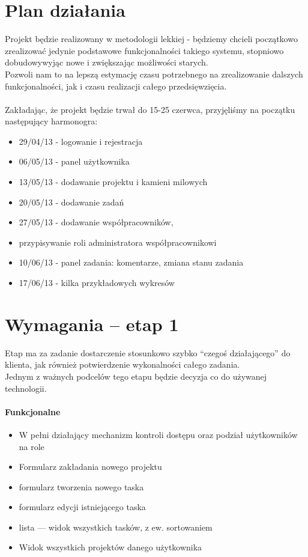\documentclass[a4paper,12pt,notitlepage]{mwrep}
\begin{document}
\section{Plan działania}
Projekt będzie realizowany w metodologii lekkiej - będziemy chcieli początkowo
zrealizować jedynie podstawowe funkcjonalności takiego systemu, stopniowo dobudowywyjąc
nowe i zwiększając możliwości starych.\\
Pozwoli nam to na lepszą estymację czasu potrzebnego na zrealizowanie dalszych funkcjonalności,
jak i czasu realizacji całego przedsięwzięcia.
\\
\\
Zakładając, że projekt będzie trwał do 15-25 czerwca, przyjęliśmy na początku następujący harmonogra:
\begin{itemize}
	\item	29/04/13 - logowanie i rejestracja
	\item	06/05/13 - panel użytkownika
	\item	13/05/13 - dodawanie projektu i kamieni milowych
	\item	20/05/13 - dodawanie zadań
	\item	27/05/13 - dodawanie współpracowników,
	\item	przypisywanie roli administratora współpracownikowi
	\item	10/06/13 - panel zadania: komentarze, zmiana stanu
		zadania
	\item	17/06/13 - kilka przykładowych wykresów

\end{itemize}




\section{Wymagania -- etap 1}
Etap ma za zadanie dostarczenie stosunkowo szybko “czegoś działającego” do klienta,
jak również potwierdzenie wykonalności całego zadania.\\
Jednym z ważnych podcelów tego etapu będzie decyzja co do używanej technologii.
\paragraph{Funkcjonalne}
\begin{itemize}
	\item	W pełni działający mechanizm kontroli dostępu oraz podział użytkowników na role
	\item	Formularz zakładania nowego projektu
	\item	formularz tworzenia nowego taska
	\item	formularz edycji istniejącego taska
	\item	lista --- widok wszystkich tasków, z ew. sortowaniem
	\item	Widok wszystkich projektów danego użytkownika
\end{itemize}
\end{document}
